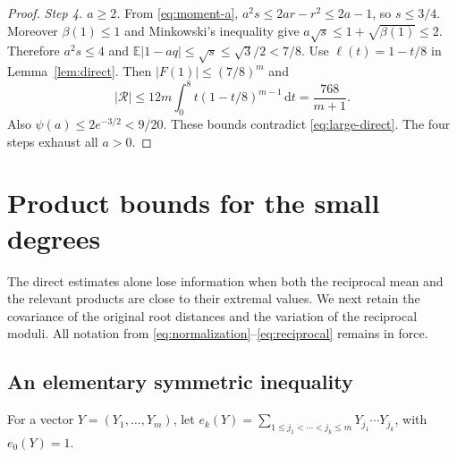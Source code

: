 \documentclass[11pt,reqno]{amsart}
\theoremstyle{definition}
\theoremstyle{remark}
\numberwithin{equation}{section}
\newcommand{\E}{\mathbb E}
\newcommand{\dd}{\,\mathrm d}
\newcommand{\step}[1]{\par\smallskip\noindent\emph{#1}\enspace}
\begin{document}
\begin{proof}
\step{Step 4. $a\ge2$.}
From \eqref{eq:moment-a}, $a^2s\le2ar-r^2\le2a-1$, so $s\le3/4$. Moreover $\beta(1)\le1$ and Minkowski's inequality give $a\sqrt s\le1+\sqrt{\beta(1)}\le2$. Therefore $a^2s\le4$ and
$\E|1-aq|\le\sqrt s\le\sqrt3/2<7/8$.
Use $\ell(t)=1-t/8$ in Lemma~\ref{lem:direct}. Then $|F(1)|\le(7/8)^m$ and
\[
 |\mathcal R|\le12m\int_0^8t(1-t/8)^{m-1}\dd t
 =\frac{768}{m+1}.
\]
Also $\psi(a)\le2e^{-3/2}<9/20$. These bounds contradict \eqref{eq:large-direct}. The four steps exhaust all $a>0$.
\end{proof}

\section{Product bounds for the small degrees}\label{sec:products}

The direct estimates alone lose information when both the reciprocal mean and the relevant products are close to their extremal values. We next retain the covariance of the original root distances and the variation of the reciprocal moduli. All notation from \eqref{eq:normalization}--\eqref{eq:reciprocal} remains in force.

\subsection{An elementary symmetric inequality}

For a vector $Y=(Y_1,\ldots,Y_m)$, let $e_k(Y)=\sum_{1\le j_1<\cdots<j_k\le m}Y_{j_1}\cdots Y_{j_k}$, with $e_0(Y)=1$.
\end{document}
